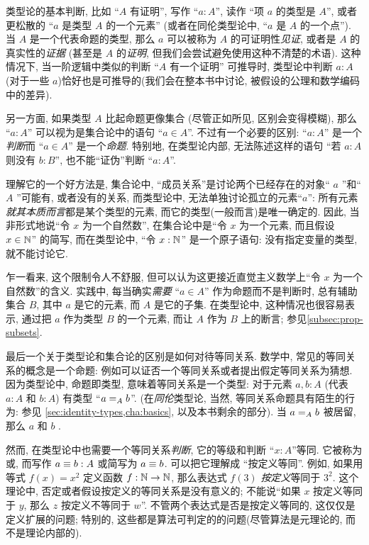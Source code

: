 类型论的基本判断, 比如 ``$A$ 有证明'', 写作 ``$a:A$'', 读作 ``项 $a$ 的类型是 $A$'', 或者更松散的 ``$a$ 是类型 $A$ 的一个元素'' (或者在同伦类型论中, ``$a$ 是 $A$ 的一个点'').
%
%
%
当 $A$ 是一个代表命题的类型, 那么 $a$ 可以被称为 $A$ 的可证明性\emph{见证}, 或者是 $A$ 的真实性的\emph{证据}
(甚至是 $A$ 的\emph{证明}, 但我们会尝试避免使用这种不清楚的术语).
这种情况下, 当一阶逻辑中类似的判断 ``$A$ 有一个证明'' 可推导时, 类型论中判断 $a:A$ (对于一些 $a$)恰好也是可推导的(我们会在整本书中讨论, 被假设的公理和数学编码中的差异).

另一方面, 如果类型 $A$ 比起命题更像集合 (尽管正如所见, 区别会变得模糊), 那么 ``$a:A$'' 可以视为是集合论中的语句 ``$a\in A$''.
不过有一个必要的区别: ``$a:A$'' 是一个\emph{判断}而 ``$a\in A$'' 是一个\emph{命题}.
特别地, 在类型论内部, 无法陈述这样的语句 ``若 $a:A$ 则没有 $b:B$'', 也不能``证伪''判断 ``$a:A$''.

理解它的一个好方法是, 集合论中, ``成员关系''是讨论两个已经存在的对象`` $a$ ''和`` $A$ ''可能有, 或者没有的关系, 而类型论中, 无法单独讨论孤立的元素``$a$'': 所有元素\emph{就其本质而言}都是某个类型的元素, 而它的类型(一般而言)是唯一确定的.
因此, 当非形式地说``令 $x$ 为一个自然数'', 在集合论中是``令 $x$ 为一个元素, 而且假设 $x\in\nat$'' 的简写, 而在类型论中, ``令 $x:\nat$'' 是一个原子语句: 没有指定变量的类型, 就不能讨论它.
%

乍一看来, 这个限制令人不舒服, 但可以认为这更接近直觉主义数学上``令 $x$ 为一个自然数''的含义.
实践中, 每当确实\emph{需要} ``$a\in A$'' 作为命题而不是判断时, 总有辅助集合 $B$, 其中 $a$ 是它的元素, 而 $A$ 是它的子集.
在类型论中, 这种情况也很容易表示, 通过把 $a$ 作为类型 $B$ 的一个元素, 而让 $A$ 作为 $B$ 上的断言;
参见\cref{subsec:prop-subsets}.

最后一个关于类型论和集合论的区别是如何对待等同关系.
数学中, 常见的等同关系的概念是一个命题: 例如可以证否一个等同关系或者提出假定等同关系为猜想.
因为类型论中, 命题即类型, 意味着等同关系是一个类型: 对于元素 $a,b:A$ (代表 $a:A$ 和 $b:A$) 有类型 ``$\id[A]ab$''.
(在\emph{同伦}类型论, 当然, 等同关系命题具有陌生的行为: 参见 \cref{sec:identity-types,cha:basics}, 以及本书剩余的部分).
当 $\id[A]ab$ 被居留, 那么 $a$ 和 $b$ .
%
%

然而, 在类型论中也需要一个等同关系\emph{判断}, 它的等级和判断 ``$x:A$''等同.
%
%
它被称为%
%
%
或,
%
%
而写作 $a\jdeq b : A$ 或简写为 $a \jdeq b$.
可以把它理解成 ``按定义等同''.
例如, 如果用等式 $f(x)=x^2$ 定义函数 $f:\nat\to\nat$, 那么表达式 $f(3)$ \emph{按定义}等同于 $3^2$.
这个理论中, 否定或者假设按定义的等同关系是没有意义的;
不能说``如果 $x$ 按定义等同于 $y$, 那么 $z$ 按定义不等同于 $w$''.
不管两个表达式是否是按定义等同的, 这仅仅是定义扩展的问题;
特别的, 这些都是算法可判定的的问题(尽管算法是元理论的, 而不是理论内部的).
%

